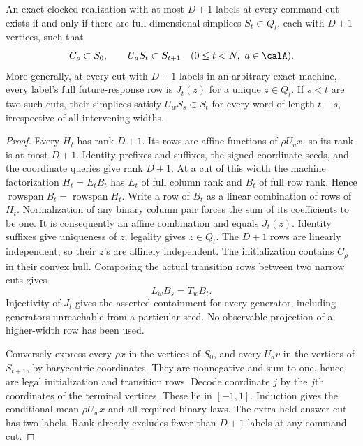 \begin{theorem}\label{thm:simplex50}
An exact clocked realization with at most $D+1$ labels at every command
cut exists if and only if there are full-dimensional simplices
$S_t\subset Q_t$, each with $D+1$ vertices, such that
\begin{equation}\label{eq:simplex50}
 C_\rho\subset S_0,\qquad U_aS_t\subset S_{t+1}
       \quad(0\le t<N,\ a\in\calA).
\end{equation}
More generally, at every cut with $D+1$ labels in an arbitrary exact
machine, every label's full future-response row is $J_t(z)$ for a
unique $z\in Q_t$. If $s<t$ are two such cuts, their simplices satisfy
$U_wS_s\subset S_t$ for every word of length $t-s$, irrespective of
all intervening widths.
\end{theorem}
\begin{proof}
Every $H_t$ has rank $D+1$. Its rows are affine functions of
$\rho U_ux$, so its rank is at most $D+1$. Identity prefixes and suffixes,
the signed coordinate seeds, and the coordinate queries give rank
$D+1$. At a cut of this width the machine factorization $H_t=E_tB_t$
has $E_t$ of full column rank and $B_t$ of full row rank. Hence
$\operatorname{rowspan}B_t=\operatorname{rowspan}H_t$. Write a row of
$B_t$ as a linear combination of rows of $H_t$. Normalization of any
binary column pair forces the sum of its coefficients to be one.
It is consequently an affine combination and equals $J_t(z)$.
Identity suffixes give uniqueness of $z$; legality gives $z\in Q_t$.
The $D+1$ rows are linearly independent, so their $z$'s are affinely
independent. The initialization contains $C_\rho$ in their convex hull.
Composing the actual transition rows between two narrow cuts gives
\[
 L_wB_s=T_wB_t.
\]
Injectivity of $J_t$ gives the asserted containment for every generator,
including generators unreachable from a particular seed. No observable
projection of a higher-width row has been used.

Conversely express every $\rho x$ in the vertices of $S_0$, and every
$U_av$ in the vertices of $S_{t+1}$, by barycentric coordinates. They
are nonnegative and sum to one, hence are legal initialization and
transition rows. Decode coordinate $j$ by the $j$th coordinates of
the terminal vertices. These lie in $[-1,1]$. Induction gives the
conditional mean $\rho U_wx$ and all required binary laws. The extra
held-answer cut has two labels. Rank already excludes fewer than
$D+1$ labels at any command cut.
\end{proof}

